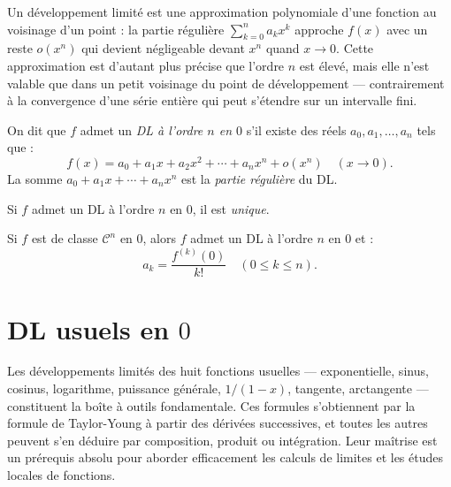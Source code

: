 \documentclass[11pt,a4paper,twoside]{book}
\begin{document}
Un développement limité est une approximation polynomiale d'une fonction au voisinage d'un point : la partie régulière $\sum_{k=0}^n a_k x^k$ approche $f(x)$ avec un reste $o(x^n)$ qui devient négligeable devant $x^n$ quand $x \to 0$. Cette approximation est d'autant plus précise que l'ordre $n$ est élevé, mais elle n'est valable que dans un petit voisinage du point de développement — contrairement à la convergence d'une série entière qui peut s'étendre sur un intervalle fini.

\begin{definitionbox}
On dit que $f$ admet un \emph{DL à l'ordre $n$ en $0$} s'il existe des réels
$a_0, a_1, \ldots, a_n$ tels que :
\[
  f(x) = a_0 + a_1 x + a_2 x^2 + \cdots + a_n x^n + o(x^n) \quad (x \to 0).
\]
La somme $a_0 + a_1 x + \cdots + a_n x^n$ est la \emph{partie régulière} du DL.
\end{definitionbox}

\begin{theoremebox}[Unicité du DL]
Si $f$ admet un DL à l'ordre $n$ en $0$, il est \emph{unique}.
\end{theoremebox}

\begin{theoremebox}
Si $f$ est de classe $\mathcal{C}^n$ en $0$, alors $f$ admet un DL à l'ordre $n$ en $0$ et :
\[
  a_k = \frac{f^{(k)}(0)}{k!} \quad (0 \leq k \leq n).
\]
\end{theoremebox}

\section{DL usuels en $0$}

Les développements limités des huit fonctions usuelles — exponentielle, sinus, cosinus, logarithme, puissance générale, $1/(1-x)$, tangente, arctangente — constituent la boîte à outils fondamentale. Ces formules s'obtiennent par la formule de Taylor-Young à partir des dérivées successives, et toutes les autres peuvent s'en déduire par composition, produit ou intégration. Leur maîtrise est un prérequis absolu pour aborder efficacement les calculs de limites et les études locales de fonctions.
\end{document}
